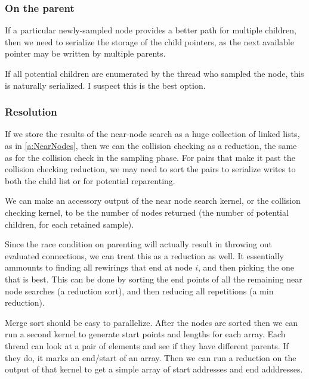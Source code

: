 \subsubsection{On the parent}
If a particular newly-sampled node provides a better path for multiple children, then we need to serialize the storage of the child pointers, as the next available pointer may be written by multiple parents. 

If all potential children are enumerated by the thread who sampled the node, this is naturally serialized. I suspect this is the best option. 

\subsubsection{Resolution}
If we store the results of the near-node search as a huge collection of linked lists, as in \ref{a:NearNodes}, then we can the collision checking as a reduction, the same as for the collision check in the sampling phase. For pairs that make it past the collision checking reduction, we may need to sort the pairs to serialize writes to both the child list or for potential reparenting. 

We can make an accessory output of the near node search kernel, or the collision checking kernel, to be the number of nodes returned (the number of potential children, for each retained sample). 

Since the race condition on parenting will actually result in throwing out evaluated connections, we can treat this as a reduction as well. It essentially ammounts to finding all rewirings that end at node $i$, and then picking the one that is best. This can be done by sorting the end points of all the remaining near node searches (a reduction sort), and then reducing all repetitions (a min reduction). 
 
\begin{figure}[H]
\begin{centering}
    \texttt{[image: \\figfile\{fig/kernel\_near\_rotate]}}
    \caption{Near Reduction}
\end{centering} 
\end{figure}

Merge sort should be easy to parallelize. After the nodes are sorted then we can run a second kernel to generate start points and lengths for each array. Each thread can look at a pair of elements and see if they have different parents. If they do, it marks an end/start of an array. Then we can run a reduction on the output of that kernel to get a simple array of start addresses and end adddresses. 

